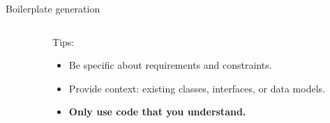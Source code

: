\documentclass[
  aspectratio=1610,
]{beamer}
\begin{document}
\begin{frame}{Boilerplate generation}
  \begin{columns}[T,totalwidth=\textwidth]
    \begin{column}{0.6\textwidth}
    \end{column}
    \begin{column}{0.37\textwidth}
      Tips:
      \begin{itemize}
        \item Be specific about requirements and constraints.
        \item Provide context: existing classes, interfaces, or data models.
        \item \textbf{Only use code that you understand.}
      \end{itemize}
    \end{column}
  \end{columns}
\end{frame}
\end{document}
